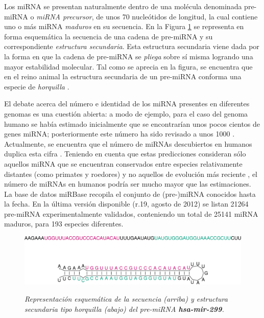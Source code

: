 \documentclass[12pt,bibliography=oldstyle,DIV=12,parskip=full-,titlepage]{scrartcl}
\begin{document}
Los miRNA se presentan naturalmente dentro de una molécula denominada
pre-miRNA o \emph{miRNA precursor}, de unos 70 nucleótidos de
longitud, la cual contiene uno o más miRNA \emph{maduros} en su
secuencia. En la Figura \ref{horquilla} se representa en forma
esquemática la secuencia de una cadena de pre-miRNA y su
correspondiente \emph{estructura secundaria}. Esta estructura
secundaria viene dada por la forma en que la cadena de pre-miRNA se
\emph{pliega} sobre sí misma logrando una mayor estabilidad
molecular. Tal como se aprecia en la figura, se encuentra que en el
reino animal la estructura secundaria de un pre-miRNA conforma una
especie de \emph{horquilla} \cite{bartel116}\cite{sewer}.

\newpage
El debate acerca del número e identidad de los miRNA presentes en
diferentes genomas es una cuestión abierta: a modo de ejemplo, para el
caso del genoma humano se había estimado inicialmente que se
encontrarían unos pocos cientos de genes miRNA; posteriormente este
número ha sido revisado a unos 1000 \cite{sewer}\cite{chang}.
Actualmente, se encuentra que el número de miRNAs descubiertos en
humanos duplica esta cifra \cite{gomes}.  Teniendo en cuenta que estas
predicciones consideran sólo aquellos miRNA que se encuentran
conservados entre especies relativamente distantes (como primates y
roedores) y no aquellos de evolución más reciente \cite{sewer}, el
número de miRNAs en humanos podría ser mucho mayor que las
estimaciones. La base de datos miRBase \cite{mirbase2}\cite{mirbase3}
recopila el conjunto de (pre-)miRNA conocidos hasta la
fecha. En la última versión disponible (r.19, agosto de 2012) se listan
21264 pre-miRNA experimentalmente validados, conteniendo un total de
25141 miRNA maduros, para 193 especies diferentes.
%
\begin{figure}
  \small\slshape\center
  \includegraphics[width=.9\textwidth]{res/hsa-mir-299_ss.pdf}
  \caption{\small\slshape Representación esquemática de la secuencia
    (arriba) y estructura secundaria tipo horquilla (abajo) del
    pre-miRNA \textbf{hsa-mir-299}.  }
  \label{horquilla}
\end{figure}
\end{document}
